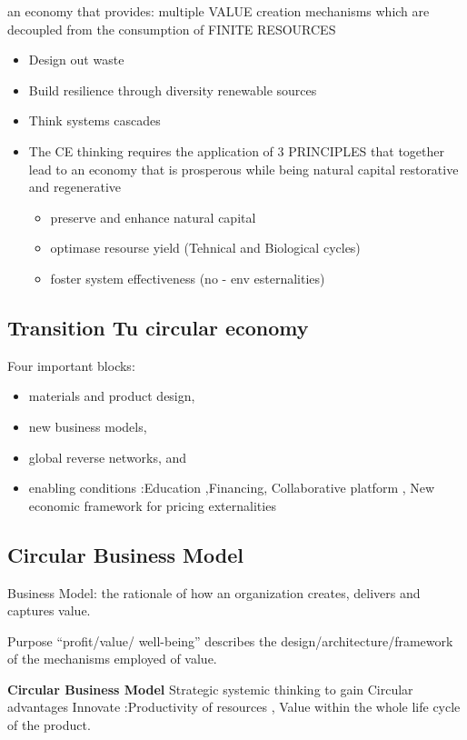 \newline an economy that provides:
multiple VALUE creation
mechanisms which are decoupled
from the consumption of FINITE
RESOURCES
\begin{itemize}
\item Design out waste
\item Build resilience
through diversity
renewable sources
\item  Think systems cascades
\item The CE thinking requires the application of 3 PRINCIPLES that together
lead to an economy that is prosperous while being natural capital
restorative and regenerative
\begin{itemize}
	\item preserve and enhance natural capital
	\item  optimase resourse yield (Tehnical and Biological cycles)
	\item foster system effectiveness (no - env esternalities)
\end{itemize}
\end{itemize}

\subsection{Transition Tu circular economy}
Four important blocks:
\begin{itemize}
\item materials and product design,
\item new business models,
\item  global reverse networks, and
\item enabling conditions :Education ,Financing, Collaborative platform , New economic framework for pricing externalities
\end{itemize}

\subsection{Circular Business Model }
Business Model: the rationale of how an organization creates,
delivers and captures value.

Purpose “profit/value/ well-being”
describes the design/architecture/framework
of the mechanisms employed of value.

\textbf{Circular Business Model}
Strategic systemic thinking to gain Circular advantages
Innovate :Productivity of resources ,
Value within the whole life cycle of the product.


